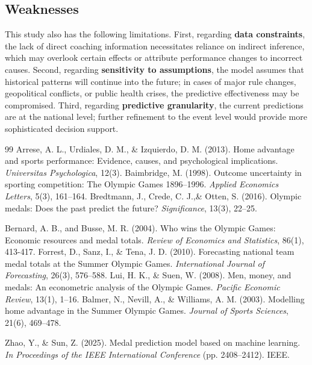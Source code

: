 \documentclass{mcmthesis}
\begin{document}
\subsection{Weaknesses}
This study also has the following limitations. First, regarding \textbf{data constraints}, the lack of direct coaching information necessitates reliance on indirect inference, which may overlook certain effects or attribute performance changes to incorrect causes. Second, regarding \textbf{sensitivity to assumptions}, the model assumes that historical patterns will continue into the future; in cases of major rule changes, geopolitical conflicts, or public health crises, the predictive effectiveness may be compromised. Third, regarding \textbf{predictive granularity}, the current predictions are at the national level; further refinement to the event level would provide more sophisticated decision support.




\begin{thebibliography}{99}
 Arrese, A. L., Urdiales, D. M., \& Izquierdo, D. M. (2013). Home advantage and sports performance: Evidence, causes, and psychological implications. \textit{Universitas Psychologica}, 12(3).
 Baimbridge, M. (1998). Outcome uncertainty in sporting competition: The Olympic Games 1896–1996. \textit{Applied Economics Letters}, 5(3), 161–164.
 Bredtmann, J., Crede, C. J.,\& Otten, S. (2016). Olympic medals: Does the past predict the future? \textit{Significance}, 13(3), 22–25.

 Bernard, A. B., and Busse, M. R. (2004). Who wins the Olympic Games: Economic resources and medal totals. \textit{Review of Economics and Statistics}, 86(1), 413-417.
Forrest, D., Sanz, I., \& Tena, J. D. (2010). Forecasting national team medal totals at the Summer Olympic Games. \textit{International Journal of Forecasting}, 26(3), 576–588.
Lui, H. K., \& Suen, W. (2008). Men, money, and medals: An econometric analysis of the Olympic Games. \textit{Pacific Economic Review}, 13(1), 1–16.
Balmer, N., Nevill, A., \& Williams, A. M. (2003). Modelling home advantage in the Summer Olympic Games. \textit{Journal of Sports Sciences}, 21(6), 469–478.

Zhao, Y., \& Sun, Z. (2025). Medal prediction model based on machine learning. \textit{In Proceedings of the IEEE International Conference} (pp. 2408–2412). IEEE.
\end{thebibliography}
\end{document}

